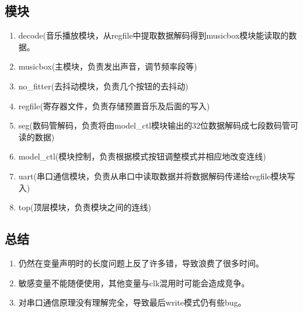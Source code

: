 \documentclass{ctexart}
\begin{document}
	\subsection{模块}
	\begin{enumerate}
		\item decode(音乐播放模块，从regfile中提取数据解码得到musicbox模块能读取的数据。
		\item musicbox(主模块，负责发出声音，调节频率段等)
		\item no\_fitter(去抖动模块，负责几个按钮的去抖动)
		\item regfile(寄存器文件，负责存储预置音乐及后面的写入)
		\item seg(数码管解码，负责将由model\_ctl模块输出的32位数据解码成七段数码管可读的数据)
		\item model\_ctl(模块控制，负责根据模式按钮调整模式并相应地改变连线)
		\item uart(串口通信模块，负责从串口中读取数据并将数据解码传递给regfile模块写入)
		\item top(顶层模块，负责模块之间的连线)
	\end{enumerate}
	\subsection{总结}
	\begin{enumerate}
		\item 仍然在变量声明时的长度问题上反了许多错，导致浪费了很多时间。
		\item 敏感变量不能随便使用，其他变量与clk混用时可能会造成竞争。
		\item 对串口通信原理没有理解完全，导致最后write模式仍有些bug。
	\end{enumerate}
		
\end{document}
